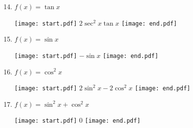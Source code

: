 \documentclass[12pt]{article}
\begin{document}
\begin{enumerate}
\setcounter{enumi}{13}

\item $f(x) = \tan{x}$ 

\texttt{[image: start.pdf]}
{{$2\sec^2{x}\tan{x}$}}
\texttt{[image: end.pdf]}


\item $f(x) = \sin{x}$ 

\texttt{[image: start.pdf]}
{{$-\sin{x}$}}
\texttt{[image: end.pdf]}


\item $f(x) = \cos^2{x}$ 

\texttt{[image: start.pdf]}
{{$2\sin^2{x}-2\cos^2{x}$}}
\texttt{[image: end.pdf]}


\item $f(x) = \sin^2{x}+\cos^2{x}$ 

\texttt{[image: start.pdf]}
{{0}}
\texttt{[image: end.pdf]}


\end{enumerate}

\newpage

\end{document}
